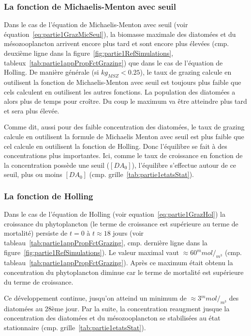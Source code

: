 {\subsubsection{La fonction de Michaelis-Menton avec seuil}
\par{
Dans le cas de l'équation de Michaelis-Menton avec seuil (voir équation~\ref{eq:partie1GrazMicSeul}),
la biomasse maximale des diatomées et du mésozooplancton arrivent encore plus tard et sont encore plus
élevées (cmp. deuxième ligne dans la figure~\ref{fig:partie1RefSimulations},
tableux~\ref{tab:partie1appPropFctGrazing}) que dans le cas de l'équation de Holling. De manière générale
(si $kg_{MSZ} < 0.25$), le taux de grazing
calcule en outilisent la fonction de Michaelis-Menton avec seuil est toujours plus faible que cels calculent
en outilisent les autres fonctions. La population des diatomées a alors plus de temps pour croître.
Du coup le maximum va être atteindre plus tard et sera plus élevée.
}
\par{
Comme dit, aussi pour des faible concentration des diatomées, le taux de grazing calcule en outilisent
la formule de Michaelis Menton avec seuil est plus faible que cel calcule en outilisent la fonction de
Holling. Donc l'équilibre se fait à des concentrations plus importantes.
Ici, comme le taux de croissance en fonction de la concentration possède une seuil ($[DA_0]$), l'équilibre
s'effectue autour de ce seuil, plus ou moins $[DA_0]$ (cmp. grille~\ref{tab:partie1etatsStat}).
}
\subsubsection{La fonction de Holling}
\par{
Dans le cas de l'équation de Holling (voir equation~\ref{eq:partie1GrazHol}) la croissance du
phytoplancton (le terme de croissance est supérieure au terme de mortalité) persiste de
$t=0$ à $t\approx 18$ jours (voir tableau~\ref{tab:partie1appPropFctGrazing}, cmp. dernière ligne
dans la figure~\ref{fig:partie1RefSimulations}). Le valeur maximal vaut $\approx 60 {^mmol}/_{m^3}$ 
(cmp. tableau~\ref{tab:partie1appPropFctGrazing}). Après ce maximum était obtenu la concentration 
du phytoplancton diminue car le terme de mortalité est supérieure du terme de croissance.
}
\par{
Ce développement continue, jusqu'on atteind un minimum de $\approx 3 {^mmol}/_{m^3}$
des diatomées au 28ème jour. Par la suite, la concentration reaugment jusque la
concentration des diatomées et du mésozooplancton se stabilisées au état
stationnaire (cmp. grille~\ref{tab:partie1etatsStat}).
}

}
